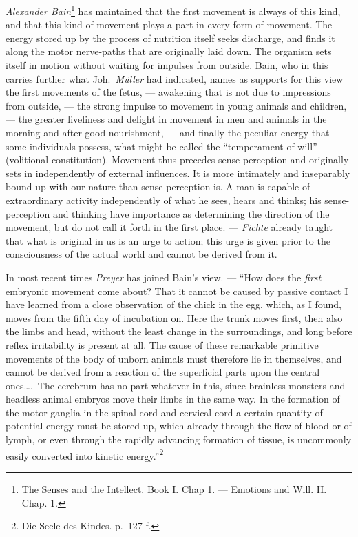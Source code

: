 \documentclass[12pt,a4paper]{book}
\newcommand{\opage}[1]{\marginnote{\footnotesize\textit{[#1]}}}
\begin{document}
\emph{Alexander Bain}\footnote{The Senses and the Intellect. Book I.
Chap 1. --- Emotions and Will. II. Chap. 1.} has maintained that the first
movement is always of this kind, and that this kind of movement plays a
part in every form of movement. The energy stored up by the process of
nutrition itself seeks discharge, and finds it along the motor nerve-paths
that are originally laid down. The organism sets itself in motion without
waiting for impulses from outside. Bain, who in this carries further what
Joh.\ \emph{Müller} had indicated, names as supports for this view the
first movements of the fetus, --- awakening that is not due to impressions
from outside, --- the strong impulse to movement in young animals and
children, --- the greater liveliness and delight in movement in men and
animals in the morning and after good nourishment, --- and finally the
peculiar energy that some individuals possess, what might be called the
``temperament of will'' (volitional
\opage{368}constitution). Movement thus precedes sense-perception and
originally sets in independently of external influences. It is more
intimately and inseparably bound up with our nature than
sense-perception is. A man is capable of extraordinary activity
independently of what he sees, hears and thinks; his sense-perception
and thinking have importance as determining the direction of the
movement, but do not call it forth in the first place. --- \emph{Fichte}
already taught that what is original in us is an urge to action; this
urge is given prior to the consciousness of the actual world and cannot
be derived from it.

In most recent times \emph{Preyer} has joined Bain's view. --- ``How
does the \emph{first} embryonic movement come about? That it cannot be
caused by passive contact I have learned from a close observation of the
chick in the egg, which, as I found, moves from the fifth day of
incubation on. Here the trunk moves first, then also the limbs and head,
without the least change in the surroundings, and long before reflex
irritability is present at all. The cause of these remarkable primitive
movements of the body of unborn animals must therefore lie in themselves,
and cannot be derived from a reaction of the superficial parts upon the
central ones\ldots.\ The cerebrum has no part whatever in this, since
brainless monsters and headless animal embryos move their limbs in the
same way. In the formation of the motor ganglia in the spinal cord and
cervical cord a certain quantity of potential energy must be stored up,
which already through the flow of blood or of lymph, or even through the
rapidly advancing formation of tissue, is uncommonly easily
converted into kinetic energy.''\footnote{Die Seele des Kindes. p.~127
f.}
\end{document}
